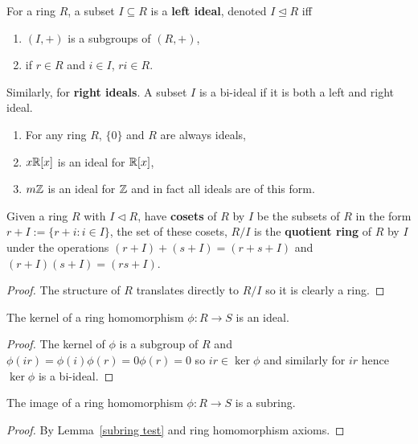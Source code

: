 \documentclass{report}
\begin{document}
\begin{definition}[Ideal]
    For a ring $R$, a subset $I\subseteq R$ is a \textbf{left ideal}, denoted $I\unlhd R$ iff \begin{enumerate}
        \item $(I,+)$ is a subgroups of $(R,+)$,
        \item if $r\in R$ and $i\in I$, $ri\in R$.
    \end{enumerate} Similarly, for \textbf{right ideals}. A subset $I$ is a bi-ideal if it is both a left and right ideal.
\end{definition}

\begin{examples}
    \begin{enumerate}
        \item For any ring $R$, $\{0\}$ and $R$ are always ideals,
        \item $x\mathbb{R}[x]$ is an ideal for $\mathbb{R}[x]$,
        \item $m\mathbb{Z}$ is an ideal for $\mathbb{Z}$ and in fact all ideals are of this form.
    \end{enumerate}
\end{examples}

\begin{definition}
    Given a ring $R$ with $I\lhd R$, have \textbf{cosets} of $R$ by $I$ be the subsets of $R$ in the form $r+I:=\{r+i:i\in I\}$, the set of these cosets, $R/I$ is the \textbf{quotient ring} of $R$ by $I$ under the operations $(r+I)+(s+I)=(r+s+I)$ and $(r+I)(s+I)=(rs+I)$.\begin{proof}
        The structure of $R$ translates directly to $R/I$ so it is clearly a ring.
    \end{proof}
\end{definition}

\begin{lemma}\label{iso1}
    The kernel of a ring homomorphism $\phi:R\rightarrow S$ is an ideal.\begin{proof}
        The kernel of $\phi$ is a subgroup of $R$ and $\phi(ir)=\phi(i)\phi(r)=0\phi(r)=0$ so $ir\in\ker\phi$ and similarly for $ir$ hence $\ker\phi$ is a bi-ideal.
    \end{proof}
\end{lemma}

\begin{lemma}\label{iso2}
    The image of a ring homomorphism $\phi:R\rightarrow S$ is a subring.\begin{proof}
        By Lemma~\ref{subring test} and ring homomorphism axioms.
    \end{proof}
\end{lemma}
\end{document}
